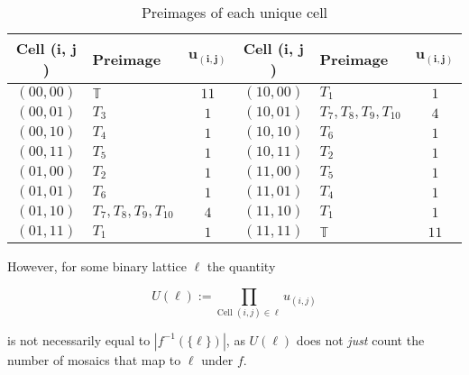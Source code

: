 \documentclass[12pt]{article}
\theoremstyle{plain}
\theoremstyle{definition}
\theoremstyle{remark}
\theoremstyle{definition}
\begin{document}
\begin{table}[h!]
    \begin{center}
        \begin{tabular}{ |c|l|c|c|l|c| } 
            \hline
            \textbf{Cell (}$\mathbf{i}$\textbf{,} $\mathbf{j}$\textbf{)} & \textbf{Preimage} & $\mathbf{u_{(i,j)}}$ & \textbf{Cell (}$\mathbf{i}$\textbf{,} $\mathbf{j}$\textbf{)} & \textbf{Preimage} & $\mathbf{u_{(i,j)}}$ \\ 
            \hline
            $(00, 00)$ & $\mathbb{T}$ & $11$ & $(10, 00)$ & $T_1$ & $1$ \\
            \hline
            $(00, 01)$ & $T_3$ & $1$ & $(10, 01)$ & $T_{7},T_{8},T_{9},T_{10}$ & $4$ \\
            \hline
            $(00, 10)$ & $T_4$ & $1$ & $(10, 10)$ & $T_6$ & $1$ \\
            \hline
            $(00, 11)$ & $T_5$ & $1$ & $(10, 11)$ & $T_2$ & $1$ \\
            \hline
            $(01, 00)$ & $T_2$ & $1$ & $(11, 00)$ & $T_5$ & $1$ \\
            \hline
            $(01, 01)$ & $T_6$ & $1$ & $(11, 01)$ & $T_4$ & $1$ \\
            \hline
            $(01, 10)$ & $T_{7},T_{8},T_{9},T_{10}$ & $4$ & $(11, 10)$ & $T_1$ & $1$ \\
            \hline
            $(01, 11)$ & $T_1$ & $1$ & $(11, 11)$ & $\mathbb{T}$ & $11$ \\
            \hline
        \end{tabular}
        \caption{Preimages of each unique cell}
        \label{tbl:Preimage of binary cell lattice}
    \end{center}
\end{table}

However, for some binary lattice $\ell$ the quantity 

\begin{equation}
    U(\ell) := \prod_{\text{Cell }(i,j) \in \ell} u_{(i,j)}
\end{equation}

is not necessarily equal to $\left|f^{-1}\left(\{\ell\}\right)\right|$, as $U(\ell)$ does not \textit{just} count the number of mosaics that map to $\ell$ under $f$. 
\end{document}
